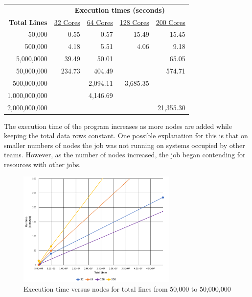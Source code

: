 \begin{tabular}{r r r r r}
 & \multicolumn{4}{c}{\textbf{Execution times (seconds)}} \\
\textbf{Total Lines} & \underline{32 Cores} & \underline{64 Cores} & \underline{128 Cores} & \underline{200 Cores} \\
       50,000 &   0.55 &     0.57 &     15.49 & 15.45 \\
      500,000 &   4.18 &     5.51 &      4.06 & 9.18 \\
   5,000,0000 &  39.49 &    50.01 &           & 65.05 \\
   50,000,000 & 234.73 &   404.49 &           & 574.71 \\
  500,000,000 &        & 2,094.11 &  3,685.35 & \\
1,000,000,000 &        & 4,146.69 &           &  \\
2,000,000,000 &        &          &           & 21,355.30 \\ 
\end{tabular}

The execution time of the program increases as more nodes are added while keeping the total data rows constant. One possible explanation for this is that on smaller numbers of nodes the job was not running on systems occupied by other teams. However, as the number of nodes increased, the job began contending for resources with other jobs.

\begin{figure}
\centering
\includegraphics[width=0.7\textwidth]{./images/Runtime1.png}
\caption{Execution time versus nodes for total lines from 50,000 to 50,000,000}
\label{fig:lownums}
\end{figure}

